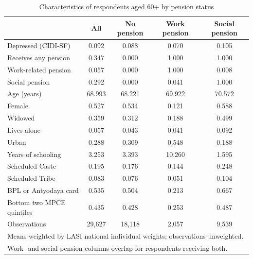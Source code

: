 \begin{table}[htbp]\centering
\def\sym#1{\ifmmode^{#1}\else\(^{#1}\)\fi}
\caption{Characteristics of respondents aged 60+ by pension status\label{tab:desc}}
\begin{tabular}{l*{4}{c}}
\toprule
                    &\multicolumn{1}{c}{All}&\multicolumn{1}{c}{No pension}&\multicolumn{1}{c}{Work pension}&\multicolumn{1}{c}{Social pension}\\
\midrule
Depressed (CIDI-SF) &       0.092&       0.088&       0.070&       0.105\\
Receives any pension&       0.347&       0.000&       1.000&       1.000\\
Work-related pension&       0.057&       0.000&       1.000&       0.008\\
Social pension      &       0.292&       0.000&       0.041&       1.000\\
Age (years)         &      68.993&      68.221&      69.922&      70.572\\
Female              &       0.527&       0.534&       0.121&       0.588\\
Widowed             &       0.359&       0.312&       0.188&       0.499\\
Lives alone         &       0.057&       0.043&       0.041&       0.092\\
Urban               &       0.288&       0.309&       0.548&       0.188\\
Years of schooling  &       3.253&       3.393&      10.260&       1.595\\
Scheduled Caste     &       0.195&       0.176&       0.144&       0.248\\
Scheduled Tribe     &       0.083&       0.076&       0.051&       0.104\\
BPL or Antyodaya card&       0.535&       0.504&       0.213&       0.667\\
Bottom two MPCE quintiles&       0.435&       0.428&       0.253&       0.487\\
\midrule
Observations        &      29,627&      18,118&       2,057&       9,539\\
\bottomrule
\multicolumn{5}{l}{\footnotesize Means weighted by LASI national individual weights; observations unweighted.}\\
\multicolumn{5}{l}{\footnotesize Work- and social-pension columns overlap for respondents receiving both.}\\
\end{tabular}
\end{table}

